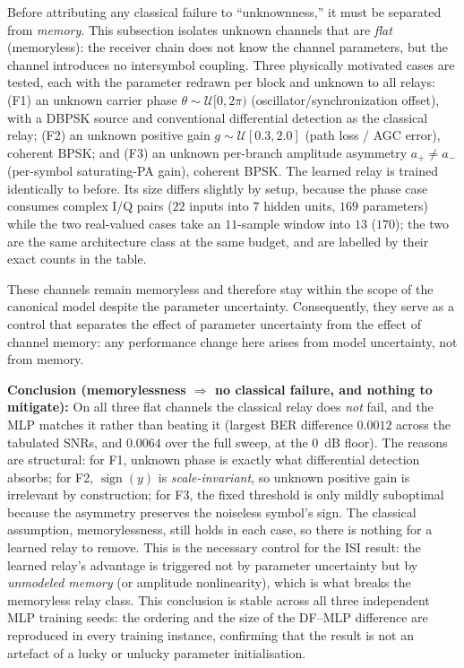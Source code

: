Before attributing any classical failure to ``unknownness,'' it must be separated from \emph{memory}. This subsection isolates unknown channels that are \emph{flat} (memoryless): the receiver chain does not know the channel parameters, but the channel introduces no intersymbol coupling. Three physically motivated cases are tested, each with the parameter redrawn per block and unknown to all relays: (F1) an unknown carrier phase $\theta\sim\mathcal{U}[0,2\pi)$ (oscillator/synchronization offset), with a DBPSK source and conventional differential detection as the classical relay; (F2) an unknown positive gain $g\sim\mathcal{U}[0.3,2.0]$ (path loss / AGC error), coherent BPSK; and (F3) an unknown per-branch amplitude asymmetry $a_+\!\neq\!a_-$ (per-symbol saturating-PA gain), coherent BPSK. The learned relay is trained identically to before. Its size differs slightly by setup, because the phase case consumes complex I/Q pairs ($22$ inputs into $7$ hidden units, $169$ parameters) while the two real-valued cases take an $11$-sample window into $13$ ($170$); the two are the same architecture class at the same budget, and are labelled by their exact counts in the table.

These channels remain memoryless and therefore stay within the scope of the canonical model despite the parameter uncertainty. Consequently, they serve as a control that separates the effect of parameter uncertainty from the effect of channel memory: any performance change here arises from model uncertainty, not from memory.

\textbf{Conclusion (memorylessness $\Rightarrow$ no classical failure, and nothing to mitigate):} On all three flat channels the classical relay does \emph{not} fail, and the MLP matches it rather than beating it (largest BER difference $0.0012$ across the tabulated SNRs, and $0.0064$ over the full sweep, at the $0$~dB floor). The reasons are structural: for F1, unknown phase is exactly what differential detection absorbs; for F2, $\operatorname{sign}(y)$ is \emph{scale-invariant}, so unknown positive gain is irrelevant by construction; for F3, the fixed threshold is only mildly suboptimal because the asymmetry preserves the noiseless symbol's sign. The classical assumption, memorylessness, still holds in each case, so there is nothing for a learned relay to remove. This is the necessary control for the ISI result: the learned relay's advantage is triggered not by parameter uncertainty but by \emph{unmodeled memory} (or amplitude nonlinearity), which is what breaks the memoryless relay class. This conclusion is stable across all three independent MLP training seeds: the ordering and the size of the DF--MLP difference are reproduced in every training instance, confirming that the result is not an artefact of a lucky or unlucky parameter initialisation.

